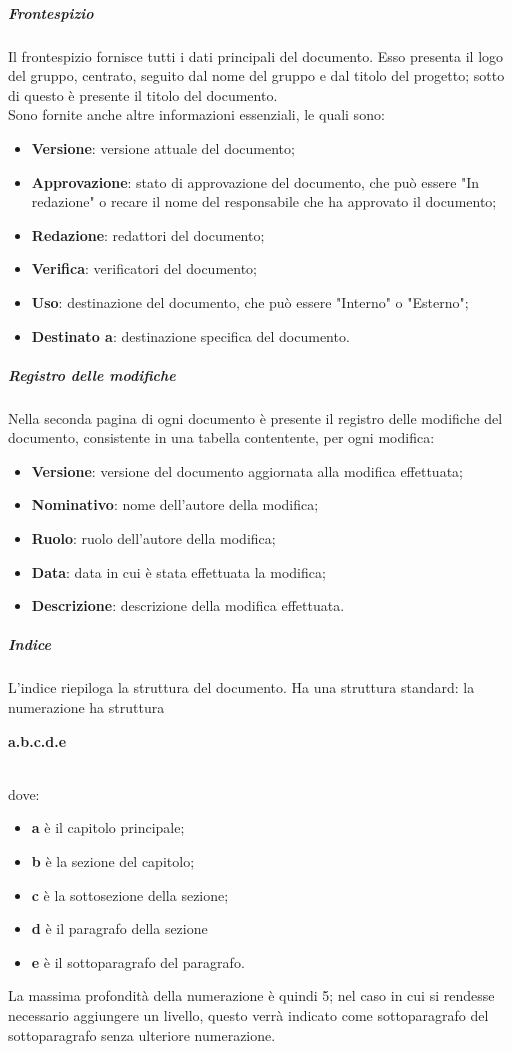\documentclass[../norme-di-progetto.tex]{subfiles}
\begin{document}
\subparagraph{Frontespizio}
Il frontespizio fornisce tutti i dati principali del documento. Esso presenta il logo del gruppo, centrato, seguito dal nome del gruppo e dal titolo del progetto; sotto di questo è presente il titolo del documento. \\
Sono fornite anche altre informazioni essenziali, le quali sono:
\begin{itemize}
  \item \textbf{Versione}: versione attuale del documento;
  \item \textbf{Approvazione}: stato di approvazione del documento, che può essere "In redazione" o recare il nome del responsabile che ha approvato il documento;
  \item \textbf{Redazione}: redattori del documento;
  \item \textbf{Verifica}: verificatori del documento;
  \item \textbf{Uso}: destinazione del documento, che può essere "Interno" o "Esterno";
  \item \textbf{Destinato a}: destinazione specifica del documento.
\end{itemize}
\subparagraph{Registro delle modifiche}
Nella seconda pagina di ogni documento è presente il registro delle modifiche del documento, consistente in una tabella contentente, per ogni modifica:
\begin{itemize}
  \item \textbf{Versione}: versione del documento aggiornata alla modifica effettuata;
  \item \textbf{Nominativo}: nome dell'autore della modifica;
  \item \textbf{Ruolo}: ruolo dell'autore della modifica;
  \item \textbf{Data}: data in cui è stata effettuata la modifica;
  \item \textbf{Descrizione}: descrizione della modifica effettuata.
\end{itemize}
\subparagraph{Indice}
L'indice riepiloga la struttura del documento. Ha una struttura standard: la numerazione ha struttura \\ \centerline{\textbf{a.b.c.d.e}} \\ dove:
\begin{itemize}
  \item \textbf{a} è il capitolo principale;
  \item \textbf{b} è la sezione del capitolo;
  \item \textbf{c} è la sottosezione della sezione;
  \item \textbf{d} è il paragrafo della sezione
  \item \textbf{e} è il sottoparagrafo del paragrafo.
\end{itemize}
La massima profondità della numerazione è quindi 5; nel caso in cui si rendesse necessario aggiungere un livello, questo verrà indicato come sottoparagrafo del sottoparagrafo senza ulteriore numerazione.
\end{document}
